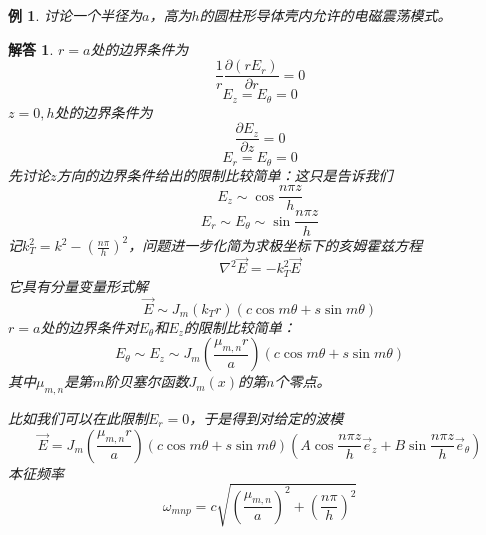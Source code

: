 \documentclass[a4paper,11pt]{ctexbook}
\newtheorem{eg}{例}[section]
\newtheorem{ans}{解答}[section]
\newcommand{\beq}{\begin{equation}}
\newcommand{\eeq}{\end{equation}}
\newcommand{\pfrac}[2]{\frac{\partial #1}{\partial #2}}
\begin{document}
\begin{eg}
讨论一个半径为$a$，高为$h$的圆柱形导体壳内允许的电磁震荡模式。
\end{eg}
\begin{ans}
$r=a$处的边界条件为
\beq
\frac{1}{r}\pfrac{(rE_r)}{r} = 0
\eeq
\beq
E_z = E_\theta = 0
\eeq
$z=0,h$处的边界条件为
\beq
\pfrac{E_z}{z} = 0
\eeq
\beq
E_r = E_\theta = 0
\eeq
先讨论$z$方向的边界条件给出的限制比较简单：这只是告诉我们
\beq
E_z \sim \cos \frac{n\pi z}{h}
\eeq
\beq
E_r \sim E_\theta \sim \sin \frac{n\pi z}{h}
\eeq
记$k_T^2 = k^2 - \left(\frac{n\pi}{h}\right)^2$，问题进一步化简为求极坐标下的亥姆霍兹方程
\beq
\nabla^2 \vec E = - k_T^2 \vec E
\eeq
它具有分量变量形式解
\beq
\vec E \sim J_m(k_T r) \left(c\cos m\theta + s \sin m \theta\right)
\eeq
$r=a$处的边界条件对$E_\theta$和$E_z$的限制比较简单：
\beq
E_\theta \sim E_z \sim J_m(\frac{\mu_{m,n}r}{a})\left(c \cos m\theta + s \sin m \theta\right)
\eeq
其中$\mu_{m,n}$是第$m$阶贝塞尔函数$J_m(x)$的第$n$个零点。
\par
比如我们可以在此限制$E_r=0$，于是得到对给定的波模
\beq
\vec E = J_m(\frac{\mu_{m,n}r}{a})\left(c \cos m\theta + s \sin m \theta\right)(A \cos \frac{n\pi z}{h} \vec{e}_z + B\sin \frac{n\pi z}{h} \vec{e}_\theta)
\eeq
本征频率\beq
\omega_{mn p} = c\sqrt{\left( \frac{\mu_{m,n}}{a}\right)^2+\left( \frac{n\pi}{h}\right)^2}
\eeq
\end{ans}
\end{document}
